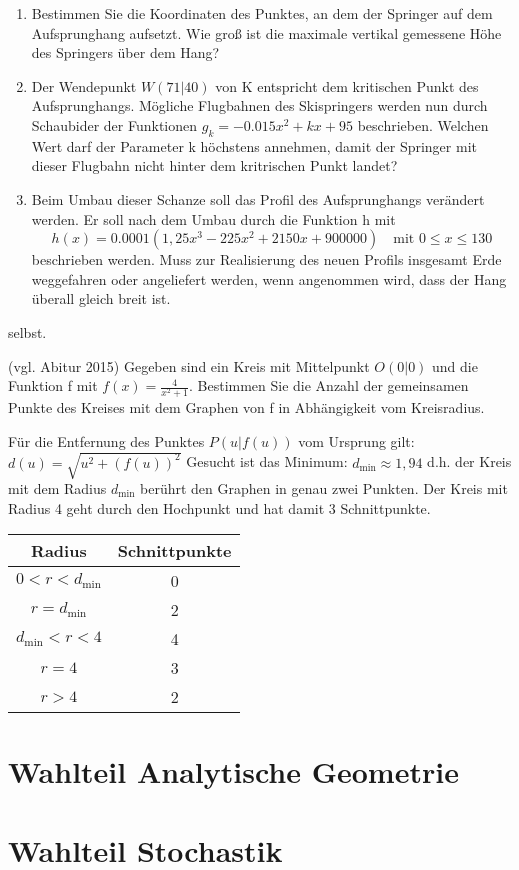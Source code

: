 \begin{enumerate}
  \item Bestimmen Sie die Koordinaten des Punktes, an dem der Springer auf dem Aufsprunghang aufsetzt. Wie groß ist die maximale vertikal gemessene Höhe des Springers über dem Hang?
  \item Der Wendepunkt $W(71|40)$ von K entspricht dem kritischen Punkt des Aufsprunghangs. Mögliche Flugbahnen des Skispringers werden nun durch Schaubider der Funktionen $g_k=-0.015x^2+kx+95$ beschrieben. Welchen Wert darf der Parameter k höchstens annehmen, damit der Springer mit dieser Flugbahn nicht hinter dem kritrischen Punkt landet?
  \item Beim Umbau dieser Schanze soll das Profil des Aufsprunghangs verändert werden. Er soll nach dem Umbau durch die Funktion h mit
  \begin{equation*}
    h(x)=0.0001(1,25x^3-225x^2+2150x+900000) \quad\text{mit $0\leq x \leq 130$}
  \end{equation*}
  beschrieben werden. Muss zur Realisierung des neuen Profils insgesamt Erde weggefahren oder angeliefert werden, wenn angenommen wird, dass der Hang überall gleich breit ist.
\end{enumerate}
\loesung{}
selbst.

\aufgabe{} (vgl. Abitur 2015)
Gegeben sind ein Kreis mit Mittelpunkt $O(0|0)$ und die Funktion f mit $f(x)=\frac{4}{x^2+1}$. Bestimmen Sie die Anzahl der gemeinsamen Punkte des Kreises mit dem Graphen von f in Abhängigkeit vom Kreisradius.

\loesung{}
Für die Entfernung des Punktes $P(u|f(u))$ vom Ursprung gilt:
$d(u)=\sqrt{u^2+(f(u))^2}$ Gesucht ist das Minimum:
$d_{\mathrm{min}}\approx 1,94$ d.h. der Kreis mit dem Radius $d_{\mathrm{min}}$ berührt den Graphen in genau zwei Punkten.
Der Kreis mit Radius 4 geht durch den Hochpunkt und hat damit 3 Schnittpunkte.

\bigskip
\noindent
\begin{tabular}{c | c}
  Radius & Schnittpunkte\\
  \hline $0<r<d_{\mathrm{min}}$ & 0\\
  $r=d_{\mathrm{min}}$ & 2\\
  $d_{\mathrm{min}}<r<4$ & 4\\
  $r=4$ & 3\\
  $r>4$ & 2
\end{tabular}

\aufgabe{}

\section{Wahlteil Analytische Geometrie}

\aufgabe{}

\aufgabe{}

\aufgabe{}

\section{Wahlteil Stochastik}

\aufgabe{}

\aufgabe{}
\aufgabe{}
\aufgabe{}


